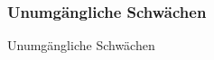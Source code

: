 \subsubsection{Unumgängliche Schwächen}\label{diskussion:schwaechen:akzeptieren}

Unumgängliche Schwächen
